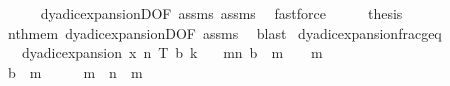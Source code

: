 \begin{isabellebody}
\ \ \ \ \isamarkupfalse%
\ dyadic{\isacharunderscore}{\kern0pt}expansionD{\isacharparenleft}{\kern0pt}{}{\isacharparenright}{\kern0pt}{\isacharbrackleft}{\kern0pt}OF\ assms{\isacharparenleft}{\kern0pt}{}{\isacharparenright}{\kern0pt}{\isacharbrackright}{\kern0pt}\ assms{\isacharparenleft}{\kern0pt}{}{\isacharparenright}{\kern0pt}\ \isamarkupfalse%
\ fastforce\isanewline
\ \ \isamarkupfalse%
\ \isamarkupfalse%
\ {\isacharquery}{\kern0pt}thesis\isanewline
\ \ \ \ \isamarkupfalse%
\ nth{\isacharunderscore}{\kern0pt}mem\ dyadic{\isacharunderscore}{\kern0pt}expansionD{\isacharparenleft}{\kern0pt}{}{\isacharparenright}{\kern0pt}{\isacharbrackleft}{\kern0pt}OF\ assms{\isacharparenleft}{\kern0pt}{}{\isacharparenright}{\kern0pt}{\isacharbrackright}{\kern0pt}\ \isamarkupfalse%
\ blast\isanewline
{}\isamarkupfalse%
%
\endisatagproof
{\isafoldproof}%
%
\isadelimproof
\isanewline
%
\endisadelimproof
\isanewline
{}\isamarkupfalse%
\ dyadic{\isacharunderscore}{\kern0pt}expansion{\isacharunderscore}{\kern0pt}frac{\isacharunderscore}{\kern0pt}geq{\isacharunderscore}{\kern0pt}{}{\isacharcolon}{\kern0pt}\isanewline
\ \ \ {\isachardoublequoteopen}dyadic{\isacharunderscore}{\kern0pt}expansion\ x\ n\ T\ b\ k{\isachardoublequoteclose}\isanewline
\ \ \ {\isachardoublequoteopen}{\isacharparenleft}{\kern0pt}{\isasymSum}m{\isasymin}{\isacharbraceleft}{\kern0pt}{}{\isachardot}{\kern0pt}{\isachardot}{\kern0pt}n{\isacharbraceright}{\kern0pt}{\isachardot}{\kern0pt}\ {\isacharparenleft}{\kern0pt}b\ {\isacharbang}{\kern0pt}\ {\isacharparenleft}{\kern0pt}m{\isacharminus}{\kern0pt}{}{\isacharparenright}{\kern0pt}{\isacharparenright}{\kern0pt}\ {\isacharslash}{\kern0pt}\ {}\ {\isacharcircum}{\kern0pt}\ m{\isacharparenright}{\kern0pt}\ {\isasymge}\ {}{\isachardoublequoteclose}\isanewline
%
\isadelimproof
%
\endisadelimproof
%
\isatagproof
{}\isamarkupfalse%
\ {\isacharminus}{\kern0pt}\isanewline
\ \ \isamarkupfalse%
\ {\isachardoublequoteopen}b\ {\isacharbang}{\kern0pt}\ {\isacharparenleft}{\kern0pt}m\ {\isacharminus}{\kern0pt}\ {}{\isacharparenright}{\kern0pt}\ {\isasymin}\ {\isacharbraceleft}{\kern0pt}{}{\isacharcomma}{\kern0pt}{}{\isacharbraceright}{\kern0pt}{\isachardoublequoteclose}\ \ {\isachardoublequoteopen}m\ {\isasymin}\ {\isacharbraceleft}{\kern0pt}{}{\isachardot}{\kern0pt}{\isachardot}{\kern0pt}n{\isacharbraceright}{\kern0pt}{\isachardoublequoteclose}\ \ m\isanewline

\end{isabellebody}
